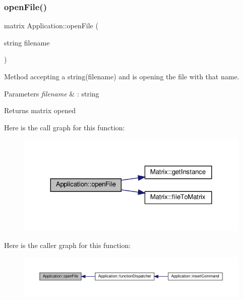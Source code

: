\subsubsection{\texorpdfstring{open\+File()}{openFile()}}
{\footnotesize\ttfamily matrix Application\+::open\+File (\begin{DoxyParamCaption}\item[{string}]{filename }\end{DoxyParamCaption})\hspace{0.3cm}{\ttfamily [private]}}

Method accepting a string(filename) and is opening the file with that name. 
\begin{DoxyParams}{Parameters}
{\em filename} & \+: string \\
\hline
\end{DoxyParams}
\begin{DoxyReturn}{Returns}
matrix opened 
\end{DoxyReturn}
Here is the call graph for this function\+:
\nopagebreak
\begin{figure}[H]
\begin{center}
\leavevmode
\includegraphics[width=324pt]{class_application_ab2f161414a4e2f16e28321c192051006_cgraph}
\end{center}
\end{figure}
Here is the caller graph for this function\+:
\nopagebreak
\begin{figure}[H]
\begin{center}
\leavevmode
\includegraphics[width=350pt]{class_application_ab2f161414a4e2f16e28321c192051006_icgraph}
\end{center}
\end{figure}
\mbox{\label{class_application_a2cbf94e01d55a814de35f90f4d874647}} 
